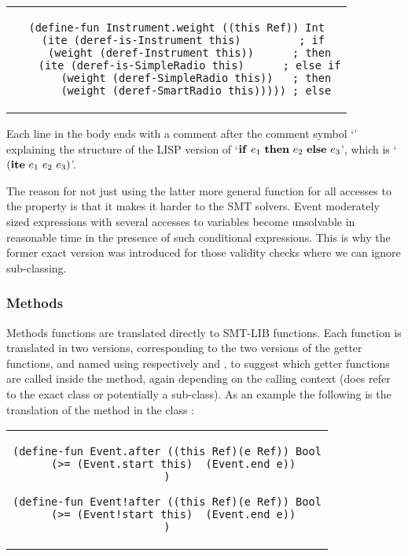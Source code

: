 \begin{center}
\begin{tabular}{c}
\begin{lstlisting}
(define-fun Instrument.weight ((this Ref)) Int
  (ite (deref-is-Instrument this)         ; if
    (weight (deref-Instrument this))      ; then
    (ite (deref-is-SimpleRadio this)      ; else if
      (weight (deref-SimpleRadio this))   ; then
      (weight (deref-SmartRadio this))))) ; else
\end{lstlisting}
\end{tabular}
\end{center}

Each line in the body ends with a comment after the comment symbol `\code{;}' explaining the structure of the LISP version of 
`${\bf if}\ e_1\ {\bf then}\ e_2\ {\bf else}\ e_3$', which is 
`$({\bf ite}\ e_1\ e_2\ e_3)$'.

The reason for not just using the latter more general function  for all accesses to the  property is that it makes it harder to the SMT solvers. Event moderately sized expressions with several accesses to variables
become unsolvable in reasonable time in the presence of such conditional expressions. This is why the former exact version  was introduced for those validity checks
where we can ignore sub-classing.

\subsubsection{Methods}

Methods functions are translated directly to SMT-LIB functions.
Each function is translated in two versions, corresponding to
the two versions of the getter functions, and named using
respectively  and 
, to suggest which getter functions are 
called inside the method, again depending on the calling context
(does  refer to the exact class or potentially
a sub-class). As an example the following is the translation of the 
 method in the class :

\begin{center}
\begin{tabular}{c}
\begin{lstlisting}
(define-fun Event.after ((this Ref)(e Ref)) Bool
  (>= (Event.start this)  (Event.end e))
)

(define-fun Event!after ((this Ref)(e Ref)) Bool
  (>= (Event!start this)  (Event.end e))
)
\end{lstlisting}
\end{tabular}
\end{center}

